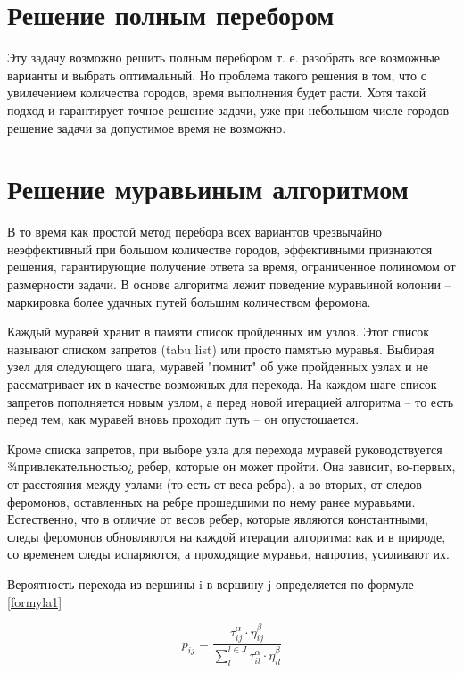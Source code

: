 \section{Решение полным перебором}\label{ChoiseSort}

Эту задачу возможно решить полным перебором т. е. разобрать все
возможные варианты и выбрать оптимальный. Но проблема такого решения
в том, что с увилечением количества городов, время выполнения будет расти.
Хотя такой подход и гарантирует точное решение задачи, уже при
небольшом числе городов решение задачи за допустимое время не возможно.

\section{Решение муравьиным алгоритмом}\label{ChoiseSort}

В то время как простой метод перебора всех вариантов чрезвычайно неэффективный при большом количестве городов, 
эффективными признаются решения, гарантирующие получение ответа за время, ограниченное
полиномом от размерности задачи.
В основе алгоритма лежит поведение муравьиной колонии – маркировка более удачных путей большим количеством феромона.

Каждый муравей хранит в памяти список пройденных им узлов. Этот список называют списком запретов (tabu list) или просто 
памятью муравья. Выбирая узел для следующего шага, муравей "помнит" об уже пройденных узлах и не рассматривает их в качестве 
возможных для перехода. На каждом шаге список запретов пополняется новым узлом, а перед новой итерацией
алгоритма – то есть перед тем, как муравей вновь проходит путь – он опустошается.

Кроме списка запретов, при выборе узла для перехода муравей руководствуется ¾привлекательностью¿ ребер, которые он может пройти. 
Она зависит, во-первых, от расстояния между узлами (то есть от веса ребра), а во-вторых, от следов феромонов, оставленных на ребре 
прошедшими по нему ранее муравьями. Естественно, что в отличие от весов ребер, которые являются константными, следы феромонов 
обновляются на каждой итерации алгоритма: как и в природе, со временем следы испаряются, а проходящие муравьи, напротив, усиливают их.

Вероятность перехода из вершины i в вершину j определяется по формуле \ref{formyla1}

\begin{equation}\label{formyla1}
  p_{ij} = \frac{\tau_{ij}^{\alpha} \cdot \eta_{ij}^{\beta}}{\sum_l^{l\in J}{\tau_{il}^{\alpha} \cdot \eta_{il}^{\beta}}}
\end{equation}

